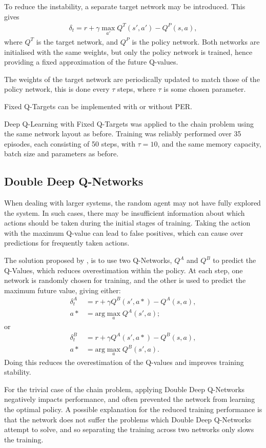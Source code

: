 To reduce the instability, a separate target network may be introduced.
This gives
\begin{align*}
    \delta_t = r + \gamma\max_{a'}Q^T(s',a') - Q^P(s,a),
\end{align*}
where $Q^T$ is the target network, and $Q^P$ is the policy network.
Both networks are initialised with the same weights, but only the policy network
is trained, hence providing a fixed approximation of the future Q-values.

The weights of the target network are periodically updated to match those of the
policy network, this is done every $\tau$ steps, where $\tau$ is some chosen
parameter.

Fixed Q-Targets can be implemented with or without PER.

Deep Q-Learning with Fixed Q-Targets was applied to the chain problem using the
same network layout as before.
Training was reliably performed over 35 episodes, each consisting of 50 steps,
with $\tau = 10$, and the same memory capacity, batch size and parameters as
before.



\subsection{Double Deep Q-Networks}

When dealing with larger systems, the random agent may not have fully explored
the system.
In such cases, there may be insufficient information about which actions should
be taken during the initial stages of training.
Taking the action with the maximum Q-value can lead to false positives, which
can cause over predictions for frequently taken actions.

The solution proposed by \cite{Hasselt:2010:Double}, is to use two Q-Networks,
$Q^A$ and $Q^B$ to predict the Q-Values, which reduces overestimation within the
policy.
At each step, one network is randomly chosen for training, and the other is used
to predict the maximum future value, giving either:
\begin{align*}
    \delta_t^A &= r + \gamma Q^B(s',a*) - Q^A(s,a),\\
    a* &= \text{arg}\max_a Q^A(s',a);
\end{align*}
or
\begin{align*}
    \delta_t^B &= r + \gamma Q^A(s',a*) - Q^B(s,a),\\
    a* &= \text{arg}\max_a Q^B(s',a).
\end{align*}
Doing this reduces the overestimation of the Q-values and improves training
stability.

For the trivial case of the chain problem, applying Double Deep Q-Networks
negatively impacts performance, and often prevented the network from learning
the optimal policy.
A possible explanation for the reduced training performance is that the network
does not suffer the problems which Double Deep Q-Networks attempt to solve, and
so separating the training across two networks only slows the training.
